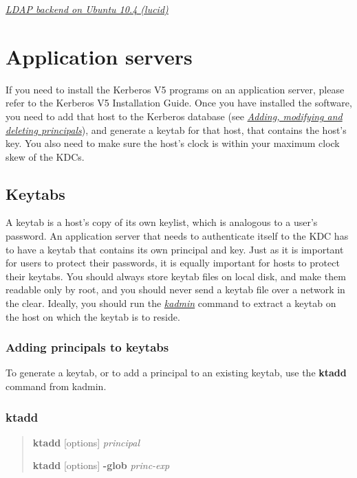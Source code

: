 \documentclass[letterpaper,10pt,english]{sphinxmanual}
\begin{document}


{\hyperref[admin/advanced/ldapbackend:ldap-be-ubuntu]{\emph{LDAP backend on Ubuntu 10.4 (lucid)}}}




\chapter{Application servers}
\label{admin/appl_servers::doc}\label{admin/appl_servers:application-servers}
If you need to install the Kerberos V5 programs on an application
server, please refer to the Kerberos V5 Installation Guide.  Once you
have installed the software, you need to add that host to the Kerberos
database (see {\hyperref[admin/database:add-mod-del-princs]{\emph{Adding, modifying and deleting principals}}}), and generate a keytab for
that host, that contains the host's key.  You also need to make sure
the host's clock is within your maximum clock skew of the KDCs.


\section{Keytabs}
\label{admin/appl_servers:keytabs}
A keytab is a host's copy of its own keylist, which is analogous to a
user's password.  An application server that needs to authenticate
itself to the KDC has to have a keytab that contains its own principal
and key.  Just as it is important for users to protect their
passwords, it is equally important for hosts to protect their keytabs.
You should always store keytab files on local disk, and make them
readable only by root, and you should never send a keytab file over a
network in the clear.  Ideally, you should run the {\hyperref[admin/admin_commands/kadmin_local:kadmin-1]{\emph{kadmin}}}
command to extract a keytab on the host on which the keytab is to
reside.


\subsection{Adding principals to keytabs}
\label{admin/appl_servers:adding-principals-to-keytabs}\label{admin/appl_servers:add-princ-kt}
To generate a keytab, or to add a principal to an existing keytab, use
the \textbf{ktadd} command from kadmin.


\subsection{ktadd}
\label{admin/appl_servers:ktadd}\begin{quote}

\begin{DUlineblock}{0em}
\item[] \textbf{ktadd} {[}options{]} \emph{principal}
\item[] \textbf{ktadd} {[}options{]} \textbf{-glob} \emph{princ-exp}
\end{DUlineblock}
\end{quote}
\end{document}
